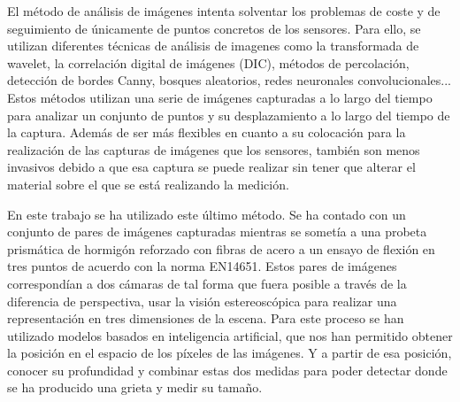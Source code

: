 El método de análisis de imágenes intenta solventar los problemas de coste y de seguimiento de únicamente de puntos concretos de los sensores. Para ello, se utilizan diferentes técnicas de análisis de imagenes \cite{Khan2023Image} como la transformada de wavelet, la correlación digital de imágenes (DIC), métodos de percolación, detección de bordes Canny, bosques aleatorios, redes neuronales convolucionales... Estos métodos utilizan una serie de imágenes capturadas a lo largo del tiempo para analizar un conjunto de puntos y su desplazamiento a lo largo del tiempo de la captura. Además de ser más flexibles en cuanto a su colocación para la realización de las capturas de imágenes que los sensores, también son menos invasivos debido a que esa captura se puede realizar sin tener que alterar el material sobre el que se está realizando la medición.

En este trabajo se ha utilizado este último método. Se ha contado con un conjunto de pares de imágenes capturadas mientras se sometía a una probeta prismática de hormigón reforzado con fibras de acero a un ensayo de flexión en tres puntos de acuerdo con la norma EN14651. Estos pares de imágenes correspondían a dos cámaras de tal forma que fuera posible a través de la diferencia de perspectiva, usar la visión estereoscópica para realizar una representación en tres dimensiones de la escena. Para este proceso se han utilizado modelos basados en inteligencia artificial, que nos han permitido obtener la posición en el espacio de los píxeles de las imágenes. Y a partir de esa posición, conocer su profundidad y combinar estas dos medidas para poder detectar donde se ha producido una grieta y medir su tamaño.
